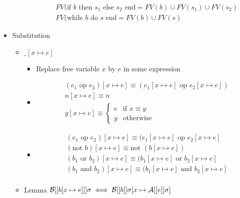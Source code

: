 \begin{itemize}
\begin{itemize}
\begin{itemize}
\begin{align*}
                            &FV(\text{if } b \text{ then } s_1 \text{ else } s_2 \text{ end} = FV(b) \cup FV(s_1) \cup FV(s_2)\\
                            &FV(\text{while } b \text{ do } s \text{ end} = FV(b) \cup FV(s)
                        \end{align*}
                \end{itemize}
        \end{itemize}
    \item Substitution
        \begin{itemize}
            \item $\_[x \mapsto e]$
                \begin{itemize}
                    \item Replace free variable $x$ by $e$ in some expression
                \end{itemize}
                \begin{itemize}
                    \item
                        \begin{align*}
                            &(e_1 \text{ op } e_2)[x \mapsto e] \equiv (e_1[x \mapsto e] \text{ op } e_2[x \mapsto e])\\
                            &n[x \mapsto e] \equiv n\\
                            &y[x \mapsto e] \equiv
\begin{cases}
    e &\text{if } x \equiv y\\
    y &\text{otherwise}
\end{cases}
                        \end{align*}
                \end{itemize}
                \begin{itemize}
                    \item
                        \begin{align*}
                            &(e_1 \text{ op } e_2)[x \mapsto e] \equiv (e_1[x \mapsto e] \text{ op } e_2[x \mapsto e]\\
                            &(\text{not } b)[x \mapsto e] \equiv \text{not } (b[x \mapsto e])\\
                            &(b_1 \text{ or } b_2)[x \mapsto e] \equiv (b_1[x \mapsto e] \text{ or } b_2[x \mapsto e]\\
                            &(b_1 \text{ and } b_2)[x \mapsto e] \equiv (b_1[x \mapsto e] \text{ and } b_2[x \mapsto e]\\
                        \end{align*}
                \end{itemize}
            \item Lemma $\mathcal{B}[[b[x \mapsto e]]] \sigma \iff \mathcal{B}[[b]]\sigma[x \mapsto \mathcal{A}[[e]] \sigma]$
        \end{itemize}
\end{itemize}

